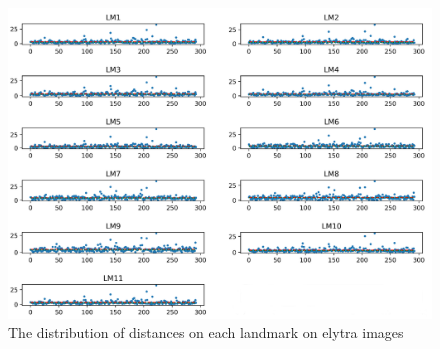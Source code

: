\documentclass[review]{elsarticle}
\begin{document}
\begin{figure}[htbp]
    \centering
    \includegraphics[width=.95\textwidth]{images/charts/elytre_2.png}
    \caption{The distribution of distances on each landmark on elytra images}
\end{figure}
\end{document}
